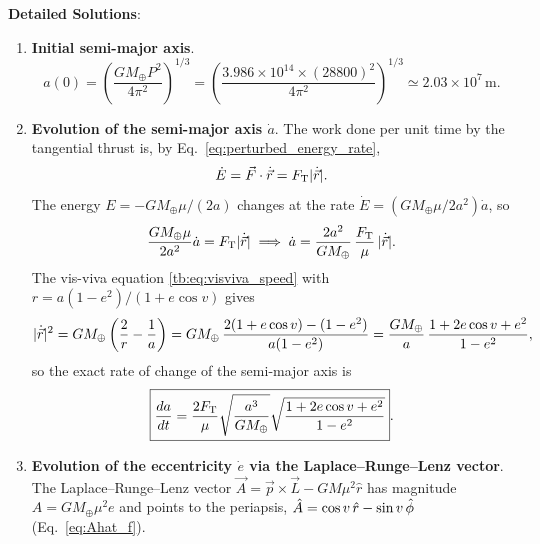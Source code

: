 \textbf{Detailed Solutions}:
\begin{enumerate}[label=(\alph*)]
	\item \textbf{Initial semi-major axis}.
	\[
	\boxed{a(0) = \left(\frac{GM_\oplus P^2}{4\pi^2}\right)^{1/3} = \left(\frac{3.986 \times 10^{14} \times (28800)^2}{4\pi^2}\right)^{1/3} \simeq 2.03 \times 10^7\,\mathrm{m}}.
	\]
	
	\item \textbf{Evolution of the semi-major axis $\dot a$}.
	The work done per unit time by the tangential thrust is, by Eq.~\eqref{eq:perturbed_energy_rate},
	\[
	\dot E = \vec F \cdot \dot{\vec r} = F_{\rm T}|\dot{\vec r}|.
	\]
	The energy $E = -GM_\oplus\mu / (2a)$ changes at the rate $\dot E=(GM_\oplus\mu/2a^2)\dot a$, so
	\[
	\frac{GM_\oplus\mu}{2a^2}\dot a = F_{\rm T}|\dot{\vec r}| \implies \dot a = \frac{2a^2}{GM_\oplus}\,\frac{F_{\rm T}}{\mu}\,|\dot{\vec r}|.
	\]
	The vis-viva equation \eqref{tb:eq:visviva_speed} with $r=a(1-e^2)/(1+e\cos v)$ gives
	\[
	|\dot{\vec r}|^2 = GM_\oplus\left(\frac{2}{r} - \frac{1}{a}\right) = GM_\oplus\,\frac{2(1+e\cos v)-(1-e^2)}{a(1-e^2)}=\frac{GM_\oplus}{a}\,\frac{1+2e\cos v + e^2}{1-e^2},
	\]
	so the exact rate of change of the semi-major axis is
	\begin{equation}
		\boxed{\frac{da}{dt} = \frac{2F_{\rm T}}{\mu}\sqrt{\frac{a^3}{GM_\oplus}}\sqrt{\frac{1+2e\cos v+e^2}{1-e^2}}}.
		\label{eq:prob8_adot}
	\end{equation}
	
	\item \textbf{Evolution of the eccentricity $\dot e$ via the Laplace--Runge--Lenz vector}.
	The Laplace--Runge--Lenz vector $\vec A = \vec p\times\vec L - GM\mu^2\hat r$ has magnitude $A = GM_\oplus\mu^2 e$ and points to the periapsis, $\hat A = \cos v\,\hat r - \sin v\,\hat\phi$ (Eq.~\eqref{eq:Ahat_f}).
	

\end{enumerate}

